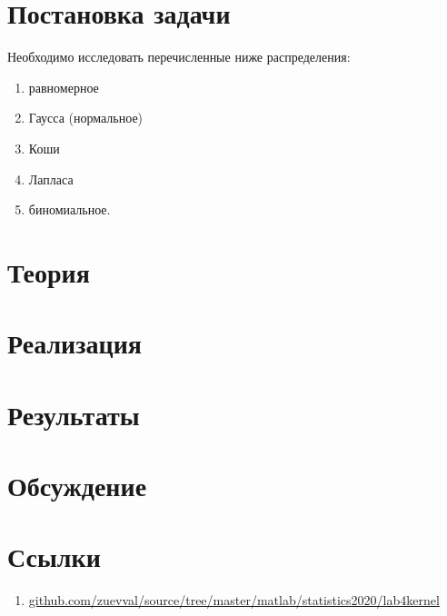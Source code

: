 \documentclass[main.tex]{subfiles}
\begin{document}
\section{Постановка задачи}
Необходимо исследовать перечисленные ниже распределения:
\begin{enumerate}
	\item равномерное
	\item Гаусса (нормальное)
	\item Коши
	\item Лапласа
	\item биномиальное.
\end{enumerate}

\newpage
\section{Теория}

\newpage
\section{Реализация}

\newpage
\section{Результаты}


\newpage
\section{Обсуждение}

\newpage
\section{Ссылки}
\begin{enumerate}
	\item \href{https://github.com/zuevval/source/tree/master/matlab/statistics2020/lab4kernel}{github.com/zuevval/source/tree/master/matlab/statistics2020/lab4kernel} \label{link:lab4}
\end{enumerate}
\end{document}
